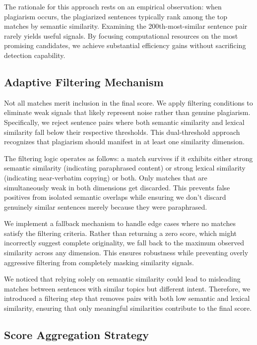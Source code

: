 \documentclass[conference]{IEEEtran}
\begin{document}
The rationale for this approach rests on an empirical observation: when plagiarism occurs, the plagiarized sentences typically rank among the top matches by semantic similarity. Examining the 200th-most-similar sentence pair rarely yields useful signals. By focusing computational resources on the most promising candidates, we achieve substantial efficiency gains without sacrificing detection capability.

\subsection{Adaptive Filtering Mechanism}

Not all matches merit inclusion in the final score. We apply filtering conditions to eliminate weak signals that likely represent noise rather than genuine plagiarism. Specifically, we reject sentence pairs where both semantic similarity and lexical similarity fall below their respective thresholds. This dual-threshold approach recognizes that plagiarism should manifest in at least one similarity dimension.

The filtering logic operates as follows: a match survives if it exhibits either strong semantic similarity (indicating paraphrased content) or strong lexical similarity (indicating near-verbatim copying) or both. Only matches that are simultaneously weak in both dimensions get discarded. This prevents false positives from isolated semantic overlaps while ensuring we don't discard genuinely similar sentences merely because they were paraphrased.

We implement a fallback mechanism to handle edge cases where no matches satisfy the filtering criteria. Rather than returning a zero score, which might incorrectly suggest complete originality, we fall back to the maximum observed similarity across any dimension. This ensures robustness while preventing overly aggressive filtering from completely masking similarity signals.

We noticed that relying solely on semantic similarity could lead to misleading matches between sentences with similar topics but different intent. Therefore, we introduced a filtering step that removes pairs with both low semantic and lexical similarity, ensuring that only meaningful similarities contribute to the final score.

\subsection{Score Aggregation Strategy}
\end{document}
